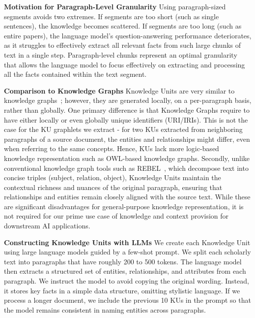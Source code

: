 \textbf{Motivation for Paragraph-Level Granularity}
Using paragraph-sized segments avoids two extremes. If segments are too short (such as single sentences), the knowledge becomes scattered. If segments are too long (such as entire papers), the language model's question-answering performance deteriorates, as it struggles to effectively extract all relevant facts from such large chunks of text in a single step. Paragraph-level chunks represent an optimal granularity that allows the language model to focus effectively on extracting and processing all the facts contained within the text segment.

\textbf{Comparison to Knowledge Graphs}
Knowledge Units are very similar to knowledge graphs~\cite{hogan2021knowledge}; however, they are generated locally, on a per-paragraph basis, rather than globally. One primary difference is that Knowledge Graphs require to have either locally or even globally unique identifiers (URI/IRIs).  This is not the case for the KU graphlets we extract - for two KUs extracted from neighboring paragraphs of a source document, the entities and relationships might differ, even when referring to the same concepts. Hence, KUs lack more logic-based knowledge representation such as OWL-based knowledge graphs. Secondly, unlike conventional knowledge graph tools such as REBEL~\citep{rebel2021}, which decompose text into concise triples (subject, relation, object), Knowledge Units maintain the contextual richness and nuances of the original paragraph, ensuring that relationships and entities remain closely aligned with the source text. While these are significant disadvantages for general-purpose knowledge representation, it is not required for our prime use case of knowledge and context provision for downstream AI applications.

\textbf{Constructing Knowledge Units with LLMs}
\label{sec:ch3:ku_pipeline}
We create each Knowledge Unit using large language models guided by a few-shot prompt. We split each scholarly text into paragraphs that have roughly 200 to 500 tokens. The language model then extracts a structured set of entities, relationships, and attributes from each paragraph. We instruct the model to avoid copying the original wording. Instead, it stores key facts in a simple data structure, omitting stylistic language. If we process a longer document, we include the previous 10 KUs in the prompt so that the model remains consistent in naming entities across paragraphs.